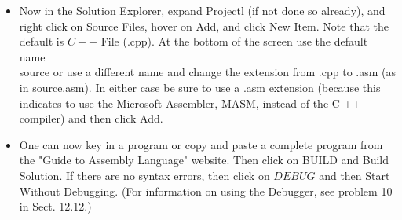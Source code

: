 \documentclass[10pt]{article}
\begin{document}
\begin{itemize}
  \item Now in the Solution Explorer, expand Projectl (if not done so already), and right click on Source Files, hover on Add, and click New Item. Note that the default is $C++$ File (.cpp). At the bottom of the screen use the default name\\
source or use a different name and change the extension from .cpp to .asm (as in source.asm). In either case be sure to use a .asm extension (because this indicates to use the Microsoft Assembler, MASM, instead of the C ++ compiler) and then click Add.
  \item One can now key in a program or copy and paste a complete program from the "Guide to Assembly Language" website. Then click on BUILD and Build Solution. If there are no syntax errors, then click on $D E B U G$ and then Start Without Debugging. (For information on using the Debugger, see problem 10 in Sect. 12.12.)
\end{itemize}
\end{document}

